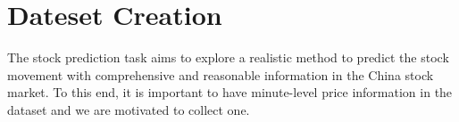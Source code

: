 \documentclass{article}
\begin{document}
\section{Dateset Creation}


\begin{table}[h]
\centering
\caption{The comparison between Astock and other existing widely-used stock prediction dataset.}
\label{comparisondata}
\end{table}
The stock prediction task aims to explore a realistic method to predict the stock movement with comprehensive and reasonable information in the China stock market. 
To this end, it is important to have minute-level price information in the dataset and we are motivated to collect one.
\end{document}
